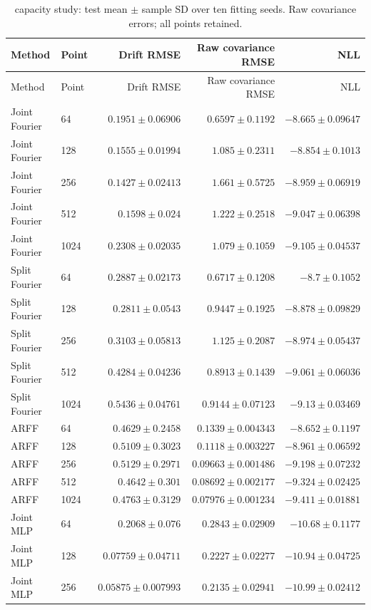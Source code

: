 \begin{longtable}{llrrr}\caption{capacity study: test mean $\pm$ sample SD over ten fitting seeds. Raw covariance errors; all points retained.}\\\toprule Method & Point & Drift RMSE & Raw covariance RMSE & NLL\\\midrule\endfirsthead\toprule Method & Point & Drift RMSE & Raw covariance RMSE & NLL\\\midrule\endhead
Joint Fourier & 64 & $0.1951\pm 0.06906$ & $0.6597\pm 0.1192$ & $-8.665\pm 0.09647$\\
Joint Fourier & 128 & $0.1555\pm 0.01994$ & $1.085\pm 0.2311$ & $-8.854\pm 0.1013$\\
Joint Fourier & 256 & $0.1427\pm 0.02413$ & $1.661\pm 0.5725$ & $-8.959\pm 0.06919$\\
Joint Fourier & 512 & $0.1598\pm 0.024$ & $1.222\pm 0.2518$ & $-9.047\pm 0.06398$\\
Joint Fourier & 1024 & $0.2308\pm 0.02035$ & $1.079\pm 0.1059$ & $-9.105\pm 0.04537$\\
Split Fourier & 64 & $0.2887\pm 0.02173$ & $0.6717\pm 0.1208$ & $-8.7\pm 0.1052$\\
Split Fourier & 128 & $0.2811\pm 0.0543$ & $0.9447\pm 0.1925$ & $-8.878\pm 0.09829$\\
Split Fourier & 256 & $0.3103\pm 0.05813$ & $1.125\pm 0.2087$ & $-8.974\pm 0.05437$\\
Split Fourier & 512 & $0.4284\pm 0.04236$ & $0.8913\pm 0.1439$ & $-9.061\pm 0.06036$\\
Split Fourier & 1024 & $0.5436\pm 0.04761$ & $0.9144\pm 0.07123$ & $-9.13\pm 0.03469$\\
ARFF & 64 & $0.4629\pm 0.2458$ & $0.1339\pm 0.004343$ & $-8.652\pm 0.1197$\\
ARFF & 128 & $0.5109\pm 0.3023$ & $0.1118\pm 0.003227$ & $-8.961\pm 0.06592$\\
ARFF & 256 & $0.5129\pm 0.2971$ & $0.09663\pm 0.001486$ & $-9.198\pm 0.07232$\\
ARFF & 512 & $0.4642\pm 0.301$ & $0.08692\pm 0.002177$ & $-9.324\pm 0.02425$\\
ARFF & 1024 & $0.4763\pm 0.3129$ & $0.07976\pm 0.001234$ & $-9.411\pm 0.01881$\\
Joint MLP & 64 & $0.2068\pm 0.076$ & $0.2843\pm 0.02909$ & $-10.68\pm 0.1177$\\
Joint MLP & 128 & $0.07759\pm 0.04711$ & $0.2227\pm 0.02277$ & $-10.94\pm 0.04725$\\
Joint MLP & 256 & $0.05875\pm 0.007993$ & $0.2135\pm 0.02941$ & $-10.99\pm 0.02412$\\

\end{longtable}
